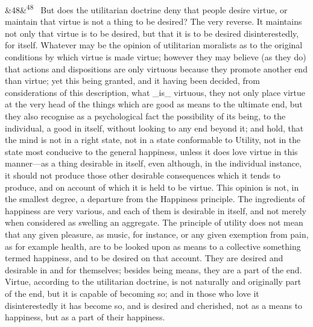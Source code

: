 \documentclass[12pt]{article}
\newcommand{\para}[1][]{\par\noindent\ifx&#1&\else\textsuperscript{\footnotesize #1}~\fi}
\begin{document}
\para[48] But does the utilitarian doctrine deny that people desire virtue, or maintain that virtue is not a thing to be desired? The very reverse. It maintains not only that virtue is to be desired, but that it is to be desired disinterestedly, for itself. Whatever may be the opinion of utilitarian moralists as to the original conditions by which virtue is made virtue; however they may believe (as they do) that actions and dispositions are only virtuous because they promote another end than virtue; yet this being granted, and it having been decided, from considerations of this description, what \_is\_ virtuous, they not only place virtue at the very head of the things which are good as means to the ultimate end, but they also recognise as a psychological fact the possibility of its being, to the individual, a good in itself, without looking to any end beyond it; and hold, that the mind is not in a right state, not in a state conformable to Utility, not in the state most conducive to the general happiness, unless it does love virtue in this manner---as a thing desirable in itself, even although, in the individual instance, it should not produce those other desirable consequences which it tends to produce, and on account of which it is held to be virtue. This opinion is not, in the smallest degree, a departure from the Happiness principle. The ingredients of happiness are very various, and each of them is desirable in itself, and not merely when considered as swelling an aggregate. The principle of utility does not mean that any given pleasure, as music, for instance, or any given exemption from pain, as for example health, are to be looked upon as means to a collective something termed happiness, and to be desired on that account. They are desired and desirable in and for themselves; besides being means, they are a part of the end. Virtue, according to the utilitarian doctrine, is not naturally and originally part of the end, but it is capable of becoming so; and in those who love it disinterestedly it has become so, and is desired and cherished, not as a means to happiness, but as a part of their happiness.
\end{document}
